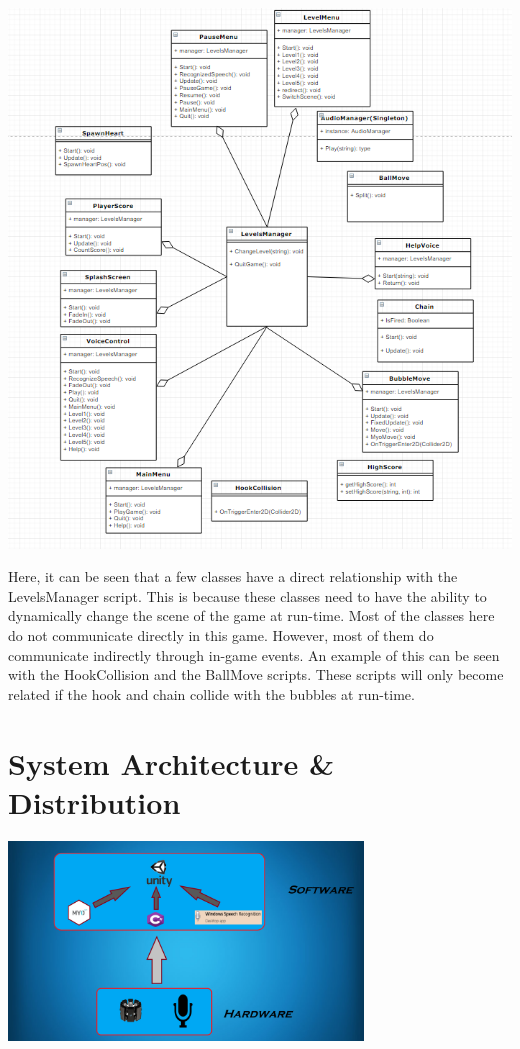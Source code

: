 \documentclass{article}
\begin{document}
\includegraphics[width=\textwidth, height=\textwidth]{img/UML.PNG}

\bigskip

Here, it can be seen that a few classes have a direct relationship with the LevelsManager script. This is because these classes need to have the ability to dynamically change the scene of the game at run-time. Most of the classes here do not communicate directly in this game. However, most of them do communicate indirectly through in-game events. An example of this can be seen with the HookCollision and  the BallMove scripts. These scripts will only become related if the hook and chain collide with the bubbles at run-time. 



\section{System Architecture \& Distribution}
\includegraphics[width=\textwidth, height=150pt]{img/gestureProjectArchitecture.png}
\end{document}
